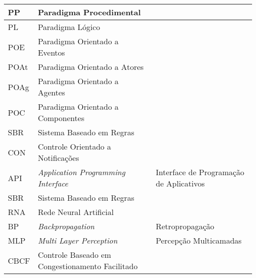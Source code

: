 \begin{tabframed}[h!]
\begin{tabularx}{\textwidth}{l|X|X}
PP      & Paradigma Procedimental                                                   &                                                    \\ \hline
PL      & Paradigma Lógico                                                          &                                                    \\ \hline
POE     & Paradigma Orientado a Eventos                                             &                                                    \\ \hline
POAt    & Paradigma Orientado a Atores                                              &                                                    \\ \hline
POAg    & Paradigma Orientado a Agentes                                             &                                                    \\ \hline
POC     & Paradigma Orientado a Componentes                                         &                                                    \\ \hline
SBR     & Sistema Baseado em Regras                                                 &                                                    \\ \hline
CON     & Controle Orientado a Notificações                                         &                                                    \\ \hline
API     & \textit{Application Programming Interface}                                & Interface de Programação de Aplicativos            \\ \hline
SBR     & Sistema Baseado em Regras                                                 &                                                    \\ \hline
RNA     & Rede Neural Artificial                                                    &                                                    \\ \hline
BP      & \textit{Backpropagation}                                                  & Retropropagação                                    \\ \hline
MLP     & \textit{Multi Layer Perception}                                           & Percepção Multicamadas                             \\ \hline
CBCF    & Controle Baseado em Congestionamento Facilitado                           &                                                   
\end{tabularx}
\end{tabframed}
